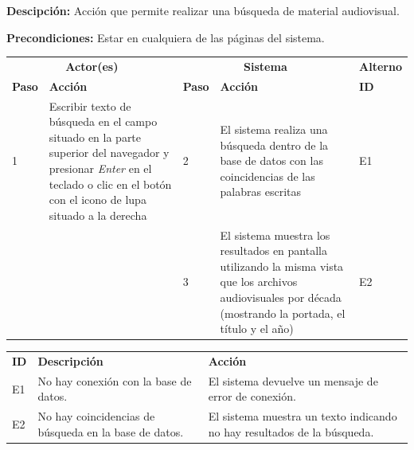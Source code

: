 \documentclass[10pt,letterpaper]{article}
\begin{document}
\textbf{Descipción: } Acción que permite realizar una búsqueda de material audiovisual.

\textbf{Precondiciones:} Estar en cualquiera de las páginas del sistema.

\begin{adjustwidth}{-6em}{-6em}
	\begin{center}
		\begin{tabularx}{1.2\textwidth}{ | p{0.7cm} | X | p{0.7cm} | X | p{1.5cm} | }
			\hline
			\rowcolor{NewBlue} \multicolumn{5}{|c|}{\textbf{Flujo normal de eventos}} \\
			\hline
			\multicolumn{2}{|c|}{\textbf{Actor(es)}}	&	\multicolumn{2}{c|}{\textbf{Sistema}}	&	\textbf{Alterno} \\
			\hline
			\textbf{Paso}	&	\textbf{Acción}	&	\textbf{Paso}	&	\textbf{Acción}	&	\textbf{ID} \\
			\hline
			1 & 
			Escribir texto de búsqueda en el campo situado en la parte superior del navegador y presionar \textit{Enter} en el teclado o clic en el botón con el icono de lupa situado a la derecha &
			2 &
			El sistema realiza una búsqueda dentro de la base de datos con las coincidencias de las palabras escritas &
			E1 \\
			\hline
			& 
			&
			3 &
			El sistema muestra los resultados en pantalla utilizando la misma vista que los archivos audiovisuales por década (mostrando la portada, el título y el año) & 
			E2\\
			\hline
		\end{tabularx}
	\end{center}
\end{adjustwidth}

\begin{adjustwidth}{-6em}{-6em}
	\begin{center}
		\begin{tabularx}{1.2\textwidth}{ | p{0.6cm} | X | X | }
			\hline
			\rowcolor{NewBlue} \multicolumn{3}{|c|}{\textbf{Flujo excepcional de eventos}} \\
			\hline
			\textbf{ID}	&	\textbf{Descripción}	&	\textbf{Acción} \\
			\hline
			E1 &
			No hay conexión con la base de datos. &
			El sistema devuelve un mensaje de error de conexión. \\
			\hline
			E2 &
			No hay coincidencias de búsqueda en la base de datos. &
			El sistema muestra un texto indicando no hay resultados de la búsqueda. \\
			\hline
		\end{tabularx}
	\end{center}
\end{adjustwidth}
\end{document}
